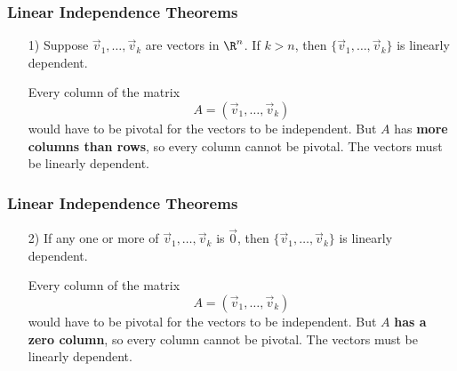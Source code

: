 \begin{frame}
\frametitle{Linear Independence Theorems}

    \begin{enumerate}
        \item[1)]  Suppose $\vec v_1,\ldots ,\vec v_k$ are vectors in $\R^n$. If $k>n$, then $\{\vec v_1,\ldots ,\vec v_k\}$ is linearly dependent.
        
        \vspace{12pt}
        \pause 
        
         Every column of the matrix \[A = (\vec v_1,\ldots ,\vec v_k ) \] would have to be pivotal for the vectors to be independent. \pause But $A$ has \textbf{more columns than rows}, so every column cannot be pivotal. The vectors must be linearly dependent. 
    \end{enumerate}
        
\end{frame}








\begin{frame}
\frametitle{Linear Independence Theorems}

    \begin{enumerate}
        \item[2)]  If any one or more of $\vec v_1,\ldots , \vec v_k$ is $\vec 0$, then $\{ \vec v_1, \ldots, \vec v_k\}$ is linearly dependent.
        
        \vspace{12pt}
        \pause 
        
         Every column of the matrix \[A = (\vec v_1,\ldots ,\vec v_k ) \] would have to be pivotal for the vectors to be independent. \pause But $A$ \textbf{has a zero column}, so every column cannot be pivotal. The vectors must be linearly dependent.         
    \end{enumerate}

\end{frame}



        
